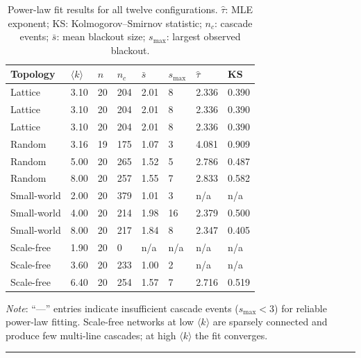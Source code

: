 \documentclass[12pt,a4paper]{article}
\begin{document}
\begin{table}[H]
\centering
\renewcommand{\arraystretch}{1.3}
\caption{Power-law fit results for all twelve configurations.
$\hat{\tau}$: MLE exponent; KS: Kolmogorov--Smirnov statistic;
$n_c$: cascade events; $\bar{s}$: mean blackout size;
$s_\text{max}$: largest observed blackout.}
\label{tab:results}
\begin{tabular}{l p{1.1cm} p{1.1cm} p{1.1cm} p{1.1cm} p{1.3cm} p{1.1cm} p{1.0cm}}
    \toprule
    \textbf{Topology}
        & $\langle k\rangle$
        & $n$
        & $n_c$
        & $\bar{s}$
        & $s_\text{max}$
        & $\hat{\tau}$
        & KS \\
    \midrule
    Lattice     & 3.10 & 20 & 204 & 2.01 &  8 & 2.336 & 0.390 \\
    Lattice     & 3.10 & 20 & 204 & 2.01 &  8 & 2.336 & 0.390 \\
    Lattice     & 3.10 & 20 & 204 & 2.01 &  8 & 2.336 & 0.390 \\
    \midrule
    Random      & 3.16 & 19 & 175 & 1.07 &  3 & 4.081 & 0.909 \\
    Random      & 5.00 & 20 & 265 & 1.52 &  5 & 2.786 & 0.487 \\
    Random      & 8.00 & 20 & 257 & 1.55 &  7 & 2.833 & 0.582 \\
    \midrule
    Small-world & 2.00 & 20 & 379 & 1.01 &  3 & n/a   & n/a   \\
    Small-world & 4.00 & 20 & 214 & 1.98 & 16 & 2.379 & 0.500 \\
    Small-world & 8.00 & 20 & 217 & 1.84 &  8 & 2.347 & 0.405 \\
    \midrule
    Scale-free  & 1.90 & 20 &   0 & n/a  & n/a& n/a   & n/a   \\
    Scale-free  & 3.60 & 20 & 233 & 1.00 &  2 & n/a   & n/a   \\
    Scale-free  & 6.40 & 20 & 254 & 1.57 &  7 & 2.716 & 0.519 \\
    \bottomrule
\end{tabular}
\begin{flushleft}
\footnotesize
\textit{Note}: ``---'' entries indicate insufficient cascade events
($s_\text{max} < 3$) for reliable power-law fitting. Scale-free
networks at low $\langle k \rangle$ are sparsely connected and
produce few multi-line cascades; at high $\langle k \rangle$ the
fit converges.
\end{flushleft}
\end{table}

\vspace{1em}
\hrule
\end{document}
